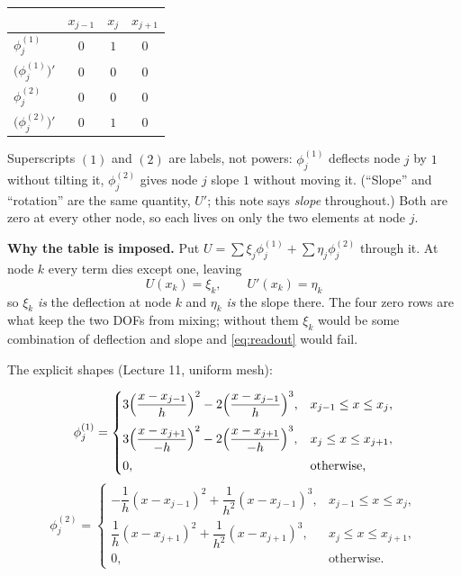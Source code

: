 \documentclass[11pt]{article}
\begin{document}
\begin{center}\small
\renewcommand{\arraystretch}{1.3}
\begin{tabular}{@{}l|ccc@{}}
\toprule
 & $x_{j-1}$ & $x_{j}$ & $x_{j+1}$\\
\midrule
$\phi^{(1)}_{j}$              & $0$ & $1$ & $0$\\
$\bigl(\phi^{(1)}_{j}\bigr)'$ & $0$ & $0$ & $0$\\
$\phi^{(2)}_{j}$              & $0$ & $0$ & $0$\\
$\bigl(\phi^{(2)}_{j}\bigr)'$ & $0$ & $1$ & $0$\\
\bottomrule
\end{tabular}
\end{center}

\begin{steps}
\item Superscripts $(1)$ and $(2)$ are labels, not powers:
      $\phi^{(1)}_{j}$ deflects node $j$ by $1$ without tilting it,
      $\phi^{(2)}_{j}$ gives node $j$ slope $1$ without moving it.
      (``Slope'' and ``rotation'' are the same quantity, $U'$; this note says
      \emph{slope} throughout.)  Both are zero
      at every other node, so each lives on only the two elements at node $j$.
\item \textbf{Why the table is imposed.}  Put
      $U=\sum\xi_{j}\phi^{(1)}_{j}+\sum\eta_{j}\phi^{(2)}_{j}$ through it.  At
      node $k$ every term dies except one, leaving
\begin{equation}\label{eq:readout}
  \boxed{\;U(x_{k})=\xi_{k},\qquad U'(x_{k})=\eta_{k}\;}
\end{equation}
      so $\xi_{k}$ \emph{is} the deflection at node $k$ and $\eta_{k}$
      \emph{is} the slope there.  The four zero rows are what keep the two DOFs
      from mixing; without them $\xi_{k}$ would be some combination of
      deflection and slope and \eqref{eq:readout} would fail.
\item The explicit shapes (Lecture 11, uniform mesh):
\end{steps}

\begin{equation}\label{eq:phi1}
  \phi^{(1)}_{j}=\begin{cases}
    3\Bigl(\dfrac{x-x_{j-1}}{h}\Bigr)^{2}-2\Bigl(\dfrac{x-x_{j-1}}{h}\Bigr)^{3},
      & x_{j-1}\le x\le x_{j},\\[2.2ex]
    3\Bigl(\dfrac{x-x_{j+1}}{-h}\Bigr)^{2}-2\Bigl(\dfrac{x-x_{j+1}}{-h}\Bigr)^{3},
      & x_{j}\le x\le x_{j+1},\\[1.6ex]
    0,&\text{otherwise,}\end{cases}
\end{equation}
\begin{equation}\label{eq:phi2}
  \phi^{(2)}_{j}=\begin{cases}
    -\dfrac{1}{h}(x-x_{j-1})^{2}+\dfrac{1}{h^{2}}(x-x_{j-1})^{3},
      & x_{j-1}\le x\le x_{j},\\[2.2ex]
    \dfrac{1}{h}(x-x_{j+1})^{2}+\dfrac{1}{h^{2}}(x-x_{j+1})^{3},
      & x_{j}\le x\le x_{j+1},\\[1.6ex]
    0,&\text{otherwise.}\end{cases}
\end{equation}
\end{document}
